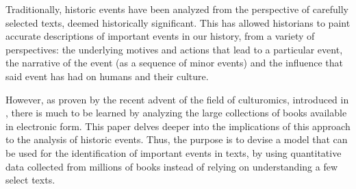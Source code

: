 
Traditionally, historic events have been analyzed from the perspective of carefully selected texts, deemed historically significant. This has allowed historians to paint accurate descriptions of important events in our history, from a variety of perspectives: the underlying motives and actions that lead to a particular event, the narrative of the event (as a sequence of minor events) and the influence that said event has had on humans and their culture.

However, as proven by the recent advent of the field of culturomics, introduced in , there is much to be learned by analyzing the large collections of books available in electronic form. This paper delves deeper into the implications of this approach to the analysis of historic events. Thus, the purpose is to devise a model that can be used for the identification of important events in texts, by using quantitative data collected from millions of books instead of relying on understanding a few select texts.
